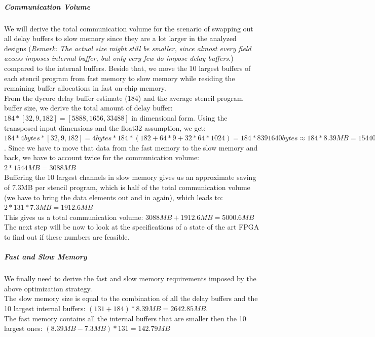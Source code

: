 \subparagraph{Communication Volume}
We will derive the total communication volume for the scenario of swapping out all delay buffers to slow memory since they are a lot larger in the analyzed designs (\textit{Remark: The actual size might still be smaller, since almost every field access imposes internal buffer, but only very few do impose delay buffers.}) compared to the internal buffers. Beside that, we move the 10 largest buffers of each stencil program from fast memory to slow memory while residing the remaining buffer allocations in fast on-chip memory. \\
From the dycore delay buffer estimate (184) and the average stencil program buffer size, we derive the total amount of delay buffer: $184 * [32, 9, 182] = [5888, 1656, 33488]$ in dimensional form. Using the transposed input dimensions and the float32 assumption, we get: $184 * 4bytes * [32, 9, 182] = 4bytes * 184 * (182 + 64*9 + 32*64*1024) = 184 * 8391640bytes \approx 184* 8.39MB = 1544061760bytes \approx 1544MB$. Since we have to move that data from the fast memory to the slow memory and back, we have to account twice for the communication volume: $2 * 1544MB = 3088MB$ \\
Buffering the 10 largest channels in slow memory gives us an approximate saving of 7.3MB per stencil program, which is half of the total communication volume (we have to bring the data elements out and in again), which leads to: $2 * 131 * 7.3MB = 1912.6MB$ \\
This gives us a total communication volume: $3088MB + 1912.6MB = 5000.6MB$ \\
The next step will be now to look at the specifications of a state of the art FPGA to find out if these numbers are feasible.


\subparagraph{Fast and Slow Memory}
We finally need to derive the fast and slow memory requirements imposed by the above optimization strategy. \\
The slow memory size is equal to the combination of all the delay buffers and the 10 largest internal buffers: $(131 + 184) * 8.39MB = 2642.85MB$.\\
The fast memory contains all the internal buffers that are smaller then the 10 largest ones: $(8.39MB - 7.3MB) * 131 = 142.79MB$

